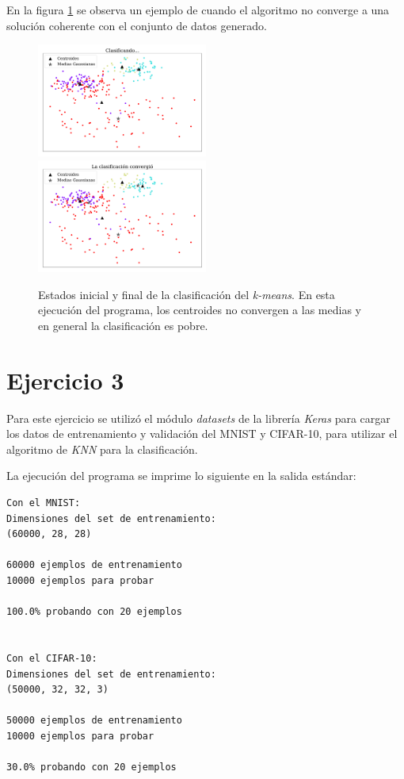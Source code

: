     En la figura \ref{fig:ejer2_no_converge} se observa un ejemplo de cuando el algoritmo no converge a una solución coherente con el conjunto de datos generado. %

    \begin{figure}[H]
        \centering
        \includegraphics[width=0.5\textwidth]{plots/ejer_2_clasificando.pdf}
        \includegraphics[width=0.5\textwidth]{plots/ejer_2_no_converge.pdf}
        \caption{Estados inicial y final de la clasificación  del \emph{k-means}. En esta ejecución del programa, los centroides no convergen a las medias y en general la clasificación  es pobre.}
        \label{fig:ejer2_no_converge}
    \end{figure}

   \section*{Ejercicio 3}

   Para este ejercicio se utilizó el módulo \emph{datasets} de la librería \emph{Keras} para cargar los datos de entrenamiento y validación del MNIST y CIFAR-10, para utilizar el algoritmo de \emph{KNN} para la clasificación.

   La ejecución del programa se imprime lo siguiente  en la salida estándar:

   \begin{verbatim}
Con el MNIST: 
Dimensiones del set de entrenamiento:  
(60000, 28, 28)

60000 ejemplos de entrenamiento
10000 ejemplos para probar

100.0% probando con 20 ejemplos


Con el CIFAR-10: 
Dimensiones del set de entrenamiento:
(50000, 32, 32, 3)

50000 ejemplos de entrenamiento
10000 ejemplos para probar

30.0% probando con 20 ejemplos
   \end{verbatim}


